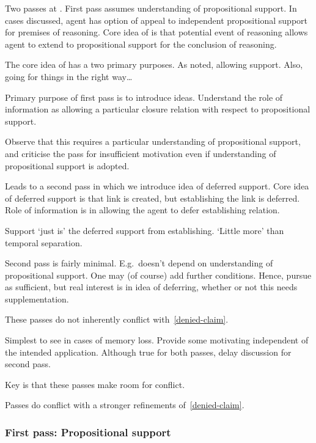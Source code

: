 \begin{note}
  Two passes at \WR{}.
  First pass assumes understanding of propositional support.
  In cases discussed, agent has option of appeal to independent propositional support for premises of reasoning.
  Core idea of \WR{} is that potential event of reasoning allows agent to extend to propositional support for the conclusion of reasoning.

  The core idea of \WR{} has a two primary purposes.
  As noted, allowing support.
  Also, going for things in the right way\dots

  Primary purpose of first pass is to introduce ideas.
  Understand the role of information as allowing a particular closure relation with respect to propositional support.

  Observe that this requires a particular understanding of propositional support, and criticise the pass for insufficient motivation even if understanding of propositional support is adopted.

  Leads to a second pass in which we introduce idea of deferred support.
  Core idea of deferred support is that link is created, but establishing the link is deferred.
  Role of information is in allowing the agent to defer establishing relation.

  Support `just is' the deferred support from establishing.
  `Little more' than temporal separation.

  Second pass is fairly minimal.
  E.g.\ doesn't depend on understanding of propositional support.
  One may (of course) add further conditions.
  Hence, pursue as sufficient, but real interest is in idea of deferring, whether or not this needs supplementation.
\end{note}

\begin{note}
  These passes do not inherently conflict with~\ref{denied-claim}.

  Simplest to see in cases of memory loss.
  Provide some motivating independent of the intended application.
  Although true for both passes, delay discussion for second pass.

  Key is that these passes make room for conflict.

  Passes do conflict with a stronger refinements of~\ref{denied-claim}.
\end{note}

\subsubsection{First pass: Propositional support}
\label{sec:first-pass:-prop}

